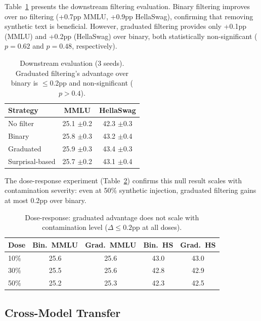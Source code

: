 \documentclass[11pt,a4paper]{article}
\begin{document}
Table~\ref{tab:filtering} presents the downstream filtering evaluation.
Binary filtering improves over no filtering (+0.7pp MMLU, +0.9pp HellaSwag), confirming that removing synthetic text is beneficial.
However, graduated filtering provides only +0.1pp (MMLU) and +0.2pp (HellaSwag) over binary, both statistically non-significant ($p=0.62$ and $p=0.48$, respectively).

\begin{table}[t]
\centering
\small
\begin{tabular}{lcc}
\toprule
\textbf{Strategy} & \textbf{MMLU} & \textbf{HellaSwag} \\
\midrule
No filter & 25.1 \scriptsize{$\pm$0.2} & 42.3 \scriptsize{$\pm$0.3} \\
Binary & 25.8 \scriptsize{$\pm$0.3} & 43.2 \scriptsize{$\pm$0.4} \\
Graduated & 25.9 \scriptsize{$\pm$0.3} & 43.4 \scriptsize{$\pm$0.3} \\
Surprisal-based & 25.7 \scriptsize{$\pm$0.2} & 43.1 \scriptsize{$\pm$0.4} \\
\bottomrule
\end{tabular}
\caption{Downstream evaluation (3 seeds). Graduated filtering's advantage over binary is $\leq$0.2pp and non-significant ($p > 0.4$).}
\label{tab:filtering}
\end{table}

The dose-response experiment (Table~\ref{tab:dose}) confirms this null result scales with contamination severity: even at 50\% synthetic injection, graduated filtering gains at most 0.2pp over binary.

\begin{table}[t]
\centering
\small
\begin{tabular}{lcccc}
\toprule
\textbf{Dose} & \textbf{Bin.\ MMLU} & \textbf{Grad.\ MMLU} & \textbf{Bin.\ HS} & \textbf{Grad.\ HS} \\
\midrule
10\% & 25.6 & 25.6 & 43.0 & 43.0 \\
30\% & 25.5 & 25.6 & 42.8 & 42.9 \\
50\% & 25.2 & 25.3 & 42.3 & 42.5 \\
\bottomrule
\end{tabular}
\caption{Dose-response: graduated advantage does not scale with contamination level ($\Delta \leq 0.2$pp at all doses).}
\label{tab:dose}
\end{table}

\subsection{Cross-Model Transfer}
\end{document}
